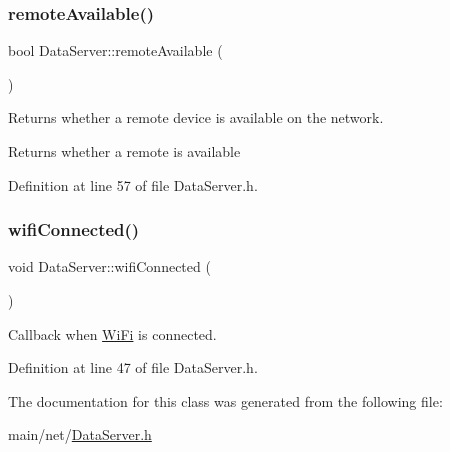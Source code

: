 \subsubsection{\texorpdfstring{remoteAvailable()}{remoteAvailable()}}
{\footnotesize\ttfamily bool Data\+Server\+::remote\+Available (\begin{DoxyParamCaption}{ }\end{DoxyParamCaption})\hspace{0.3cm}{\ttfamily [inline]}}

Returns whether a remote device is available on the network.

\begin{DoxyReturn}{Returns}
whether a remote is available 
\end{DoxyReturn}


Definition at line 57 of file Data\+Server.\+h.


\begin{DoxyCode}{0}

\end{DoxyCode}
\mbox{\label{classDataServer_a7652c5c4c0db565342ea40e031b55f87}} 
\subsubsection{\texorpdfstring{wifiConnected()}{wifiConnected()}}
{\footnotesize\ttfamily void Data\+Server\+::wifi\+Connected (\begin{DoxyParamCaption}{ }\end{DoxyParamCaption})\hspace{0.3cm}{\ttfamily [inline]}}

Callback when \mbox{\hyperlink{classWiFi}{Wi\+Fi}} is connected. 

Definition at line 47 of file Data\+Server.\+h.


\begin{DoxyCode}{0}

\end{DoxyCode}


The documentation for this class was generated from the following file\+:\begin{DoxyCompactItemize}
\item 
main/net/\mbox{\hyperlink{DataServer_8h}{Data\+Server.\+h}}\end{DoxyCompactItemize}
